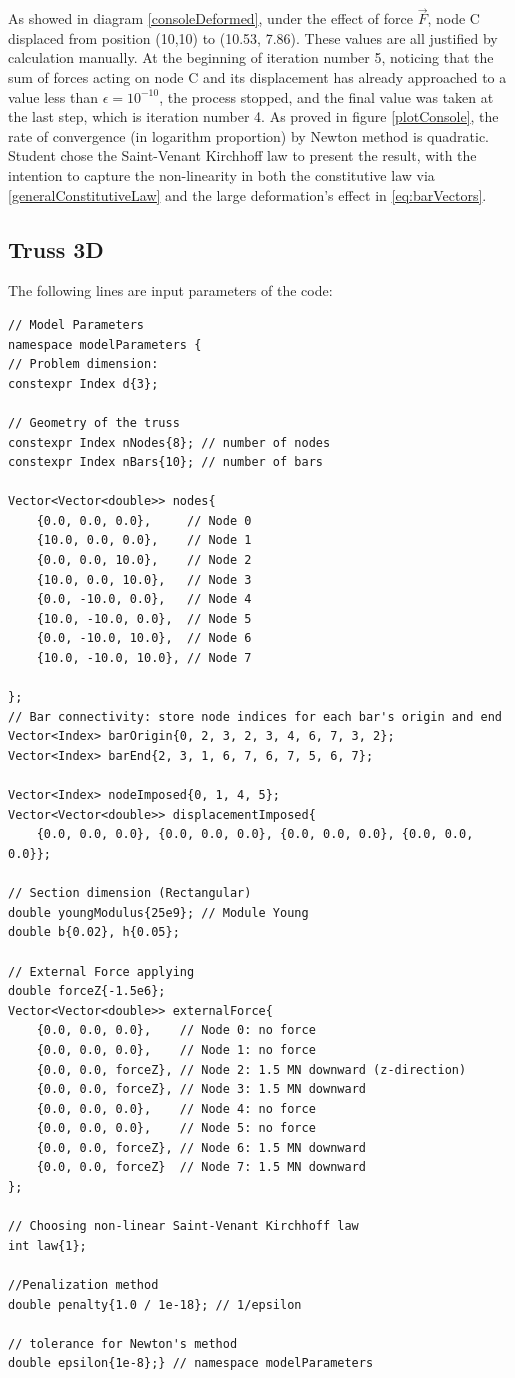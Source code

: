 \documentclass[a4paper,12pt]{article}
\numberwithin{equation}{section}
\theoremstyle{remark}
\begin{document}
As showed in diagram \cref{consoleDeformed}, under the effect of force $\vec{F}$, node C displaced from position (10,10) to (10.53, 7.86). These values are all justified by calculation manually.
At the beginning of iteration number 5, noticing that the sum of forces acting on node C and its displacement has already approached to a value less than $\epsilon = 10^{-10}$, the process stopped, and the final value was taken at the last step, which is iteration number 4.
As proved in figure \cref{plotConsole}, the rate of convergence (in logarithm proportion) by Newton method is quadratic.
Student chose the Saint-Venant Kirchhoff law to present the result, with the intention to capture the non-linearity in both the constitutive law via \cref{generalConstitutiveLaw} and the large deformation's effect in \cref{eq:barVectors}.
\subsection{Truss 3D}
The following lines are input parameters of the code:
\begin{lstlisting}[style=cpp]
// Model Parameters
namespace modelParameters {
// Problem dimension:
constexpr Index d{3};

// Geometry of the truss
constexpr Index nNodes{8}; // number of nodes
constexpr Index nBars{10}; // number of bars

Vector<Vector<double>> nodes{
    {0.0, 0.0, 0.0},     // Node 0
    {10.0, 0.0, 0.0},    // Node 1
    {0.0, 0.0, 10.0},    // Node 2
    {10.0, 0.0, 10.0},   // Node 3
    {0.0, -10.0, 0.0},   // Node 4
    {10.0, -10.0, 0.0},  // Node 5
    {0.0, -10.0, 10.0},  // Node 6
    {10.0, -10.0, 10.0}, // Node 7

};
// Bar connectivity: store node indices for each bar's origin and end
Vector<Index> barOrigin{0, 2, 3, 2, 3, 4, 6, 7, 3, 2};
Vector<Index> barEnd{2, 3, 1, 6, 7, 6, 7, 5, 6, 7};

Vector<Index> nodeImposed{0, 1, 4, 5};
Vector<Vector<double>> displacementImposed{
    {0.0, 0.0, 0.0}, {0.0, 0.0, 0.0}, {0.0, 0.0, 0.0}, {0.0, 0.0, 0.0}};

// Section dimension (Rectangular)
double youngModulus{25e9}; // Module Young
double b{0.02}, h{0.05};

// External Force applying
double forceZ{-1.5e6};
Vector<Vector<double>> externalForce{
    {0.0, 0.0, 0.0},    // Node 0: no force
    {0.0, 0.0, 0.0},    // Node 1: no force
    {0.0, 0.0, forceZ}, // Node 2: 1.5 MN downward (z-direction)
    {0.0, 0.0, forceZ}, // Node 3: 1.5 MN downward
    {0.0, 0.0, 0.0},    // Node 4: no force
    {0.0, 0.0, 0.0},    // Node 5: no force
    {0.0, 0.0, forceZ}, // Node 6: 1.5 MN downward
    {0.0, 0.0, forceZ}  // Node 7: 1.5 MN downward
};

// Choosing non-linear Saint-Venant Kirchhoff law
int law{1};

//Penalization method
double penalty{1.0 / 1e-18}; // 1/epsilon

// tolerance for Newton's method
double epsilon{1e-8};} // namespace modelParameters
\end{lstlisting}
\end{document}
